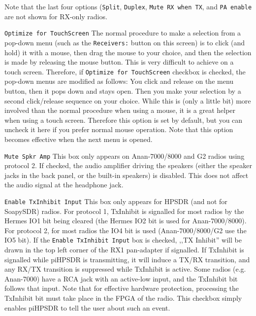 \documentclass[12pt]{book}
\def\rett#1{\texttt{\color{red}#1}}
\def\pH{pi\-HPSDR\xspace}
\begin{document}
Note that the last four options (\rett{Split}, \rett{Duplex}, \rett{Mute RX when TX},
and \rett{PA enable} are not shown for RX-only radios.

\rett{Optimize for TouchScreen} The normal procedure to make a selection from a
pop-down menu (such as the \rett{Receivers:} button on this screen) is to click
(and hold) it with a mouse, then drag the mouse to your choice, and then the selection
is made by releasing the mouse button. This is very difficult to achieve on a touch
screen. Therefore, if \rett{Optimize for TouchScreen} checkbox is checked, the pop-down
menus are modified as follows: You click and release on the menu button, then it pops
down and stays open. Then you make your selection by a second click/release sequence
on your choice. While this is (only a little bit) more involved than the normal procedure
when using a mouse, it is a great helper when using a touch screen. Therefore this
option is set by default, but you can uncheck it here if you prefer normal
mouse operation. Note that this option becomes effective when the next menu is opened.

\rett{Mute Spkr Amp} This box only appears on Anan-7000/8000 and G2 radios using protocol 2.
If checked, the audio amplifier driving the speakers (either the speaker jacks in the
back panel, or the built-in speakers) is disabled. This does not affect the audio signal
at the headphone jack.

\rett{Enable TxInhibit Input} This box only appears for HPSDR (and not for SoapySDR)
radios.
For  protocol 1, TxInhibit is signalled for most radios by the Hermes IO1 bit being
cleared (the Hermes IO2 bit is used for Anan-7000/8000). For protocol 2, for most
radios the IO4 bit is used (Anan-7000/8000/G2 use the IO5 bit).
If the \rett{Enable TxInhibit Input} box is checked, ,,TX Inhibit'' will be drawn
in the top left corner of the RX1 pan-adapter if signalled. If TxInhibit is signalled
while \pH is transmitting, it will induce a TX/RX transition, and any RX/TX
transition is suppressed while TxInhibit is active. Some radios (e.g. Anan-7000) have
a RCA jack with an active-low input, and the TxInhibit bit follows that input.
Note that for effective hardware protection, processing the TxInhibit bit must
take place in the FPGA of the radio. This checkbox simply enables \pH to tell
the user about such an event.
\end{document}
